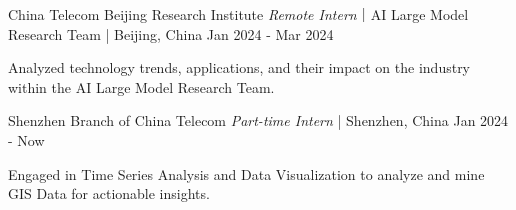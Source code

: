 
\begin{cventries2}

  \cventrynew
    {China Telecom Beijing Research Institute \textnormal{\textit{Remote Intern}｜AI Large Model Research Team} | Beijing, China} %
    {Jan 2024 - Mar 2024} %
    {
      \begin{cvitems} %
        \item {Analyzed technology trends, applications, and their impact on the industry within the AI Large Model Research Team.}
      \end{cvitems}
    }

  \cventrynew
    {Shenzhen Branch of China Telecom \textnormal{\textit{Part-time Intern}} | Shenzhen, China} %
    {Jan 2024 - Now} %
    {
      \begin{cvitems} %
        \item {Engaged in Time Series Analysis and Data Visualization to analyze and mine GIS Data for actionable insights.}
      \end{cvitems}
    }



\end{cventries2}
